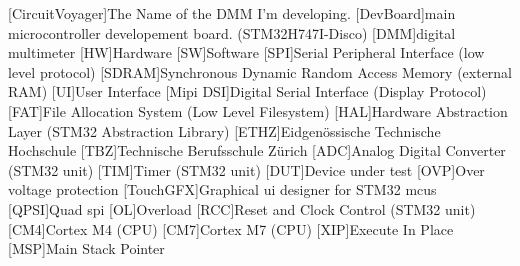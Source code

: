 \begin{acronym}
        [CircuitVoyager]{The Name of the DMM I'm developing.}
        [DevBoard]{main microcontroller developement board. (STM32H747I-Disco)}
        [DMM]{digital multimeter}
        [HW]{Hardware}
        [SW]{Software}
        [SPI]{Serial Peripheral Interface (low level protocol)}
        [SDRAM]{Synchronous Dynamic Random Access Memory (external RAM)}
        [UI]{User Interface}
        [Mipi DSI]{Digital Serial Interface (Display Protocol)}
        [FAT]{File Allocation System (Low Level Filesystem)}
        [HAL]{Hardware Abstraction Layer (STM32 Abstraction Library)}
        [ETHZ]{Eidgenössische Technische Hochschule}
        [TBZ]{Technische Berufsschule Zürich}
        [ADC]{Analog Digital Converter (STM32 unit)}
        [TIM]{Timer (STM32 unit)}
        [DUT]{Device under test}
        [OVP]{Over voltage protection}
        [TouchGFX]{Graphical \acs{ui} designer for STM32 \acs{mcu}s}
        [QPSI]{Quad \acs{spi}}
        [OL]{Overload}
        [RCC]{Reset and Clock Control (STM32 unit)}
        [CM4]{Cortex M4 (CPU)}
        [CM7]{Cortex M7 (CPU)}
        [XIP]{Execute In Place}
        [MSP]{Main Stack Pointer }
\end{acronym}